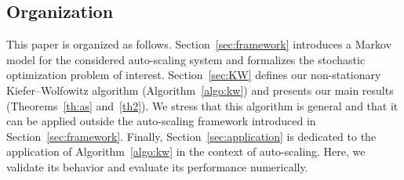 \subsection{Organization}

This paper is organized as follows.
Section~\ref{sec:framework} introduces a Markov model for the considered auto-scaling system and formalizes the stochastic optimization problem of interest.
Section~\ref{sec:KW} defines our non-stationary Kiefer--Wolfowitz algorithm (Algorithm~\ref{algo:kw}) and presents our main results (Theorems~\ref{th:as} and~\ref{th2}). We stress that this algorithm is general and that it can be applied outside the auto-scaling framework introduced in Section~\ref{sec:framework}.
Finally, Section~\ref{sec:application} is dedicated to the application of Algorithm~\ref{algo:kw} in the context of auto-scaling.
Here, we validate its behavior and evaluate its performance numerically.

